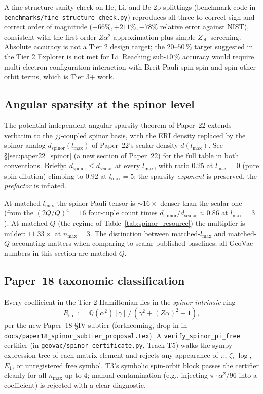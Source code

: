 \documentclass[aps,pra,twocolumn,superscriptaddress,longbibliography]{revtex4-2}
\begin{document}
A fine-structure sanity check on He, Li, and Be 2p splittings
(benchmark code in
\texttt{benchmarks/fine\_structure\_check.py}) reproduces
all three to correct sign and correct order of magnitude
($-66\%, +211\%, -78\%$ relative error against NIST), consistent
with the first-order $Z\alpha^2$ approximation plus simple
$Z_{\mathrm{eff}}$ screening. Absolute accuracy is not a Tier 2
design target; the $20$--$50\,\%$ target suggested in the Tier 2
Explorer is not met for Li. Reaching sub-$10\,\%$ accuracy would
require multi-electron configuration interaction with Breit-Pauli
spin-spin and spin-other-orbit terms, which is Tier 3+ work.

\subsection{Angular sparsity at the spinor level}
\label{subsec:spinor_sparsity_crossref}

The potential-independent angular sparsity theorem of Paper~22 extends
verbatim to the $jj$-coupled spinor basis, with the ERI density
replaced by the spinor analog $d_{\mathrm{spinor}}(l_{\max})$ of
Paper~22's scalar density $d(l_{\max})$. See \S\ref{sec:paper22_spinor}
(a new section of Paper~22) for the full table in both conventions.
Briefly: $d_{\mathrm{spinor}} \leq d_{\mathrm{scalar}}$ at every
$l_{\max}$, with ratio $0.25$ at $l_{\max}=0$ (pure spin dilution)
climbing to $0.92$ at $l_{\max}=5$; the sparsity \emph{exponent}
is preserved, the \emph{prefactor} is inflated.

At matched $l_{\max}$ the spinor Pauli tensor is $\sim 16\times$
denser than the scalar one (from the $(2Q/Q)^4 = 16$ four-tuple
count times $d_{\mathrm{spinor}}/d_{\mathrm{scalar}} \approx 0.86$
at $l_{\max}=3$). At matched $Q$ (the regime of
Table~\ref{tab:spinor_resource}) the multiplier is milder:
$11.33\times$ at $n_{\max}=3$. The distinction between matched-$l_{\max}$
and matched-$Q$ accounting matters when comparing to scalar published
baselines; all GeoVac numbers in this section are matched-$Q$.

\subsection{Paper~18 taxonomic classification}
\label{subsec:spinor_paper18}

Every coefficient in the Tier 2 Hamiltonian lies in the
\emph{spinor-intrinsic} ring
\[
  R_{\mathrm{sp}} \;:=\; \mathbb{Q}(\alpha^2)[\gamma] \,/\, (\gamma^2 + (Z\alpha)^2 - 1),
\]
per the new Paper~18 \S IV subtier (forthcoming, drop-in in
\texttt{docs/paper18\_spinor\_subtier\_proposal.tex}). A
\texttt{verify\_spinor\_pi\_free} certifier (in
\texttt{geovac/spinor\_certificate.py}, Track T5) walks the sympy
expression tree of each matrix element and rejects any appearance of
$\pi$, $\zeta$, $\log$, $E_1$, or unregistered free symbol. T3's
symbolic spin-orbit block passes the certifier cleanly for all
$n_{\max}$ up to 4; manual contamination (e.g., injecting
$\pi \cdot \alpha^2 / 96$ into a coefficient) is rejected with a
clear diagnostic.
\end{document}
